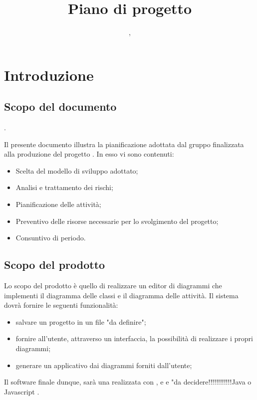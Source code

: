 

\author{\LB, \PB}
\supervisor{\GG, \MM}
\title{Piano di progetto}

\renewcommand{\arraystretch}{1.5}
\setcounter{tocdepth}{4}
\setcounter{secnumdepth}{4}


\maketitle

\tableofcontents
\newpage

\section{Introduzione}
	\subsection{Scopo del documento}.

	Il presente documento illustra la pianificazione adottata dal gruppo {\hx} finalizzata alla produzione del progetto {\proj}. In esso vi sono contenuti:
\begin{itemize}
	\item Scelta del modello di sviluppo adottato;
	\item Analisi e trattamento dei rischi;
	\item Pianificazione delle attività;
	\item Preventivo delle risorse necessarie per lo svolgimento del progetto;
    \item Consuntivo di periodo.
\end{itemize}

	\subsection{Scopo del prodotto}
	Lo scopo del prodotto è quello di realizzare un editor di diagrammi  che implementi il diagramma delle classi e il diagramma delle attività.	Il sistema dovrà fornire le seguenti funzionalità:
	\begin{itemize}
		\item salvare un progetto in un file "da definire";
		\item fornire all'utente, attraverso un interfaccia, la possibilità di realizzare i propri diagrammi;
		\item generare un applicativo  dai diagrammi forniti dall'utente;
	\end{itemize}
	Il software finale dunque, sarà una  realizzata con ,  e   e "da decidere!!!!!!!!!!!!Java o Javascript .
	
